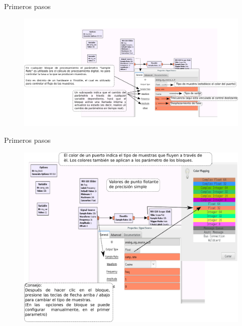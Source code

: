 \begin{frame}{Primeros pasos}
\begin{figure}[H]
\vspace{-1cm}
\centering
\includegraphics[width=1.05\textwidth]{lab1/pdf/lab1_14.pdf}
\end{figure}
\end{frame}

\begin{frame}{Primeros pasos}
\begin{figure}[H]
\vspace{-3mm}
\centering
\includegraphics[width=.80\textwidth]{lab1/pdf/lab1_15.pdf}
\end{figure}
\end{frame}

